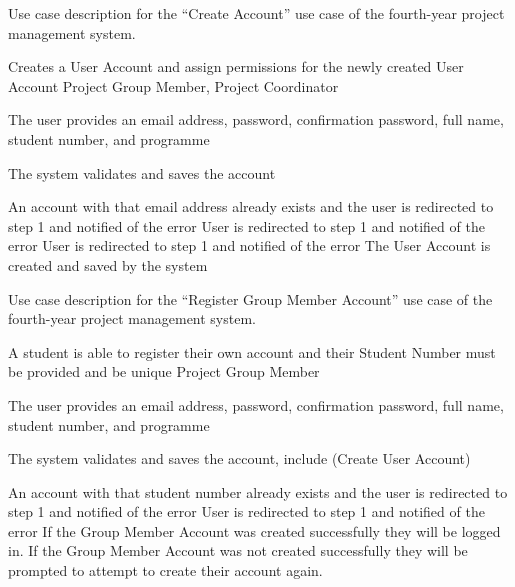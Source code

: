 \documentclass[document.tex]{subfiles}
\begin{document}
\begin{table}[!htbp]
  \centering
  \caption{Use case description for the ``Create Account'' use case of the fourth-year project management system.}
  \label{tbl:use-case-create-account}

  \begin{usecase}
    Creates a User Account and assign permissions for the newly created User Account
    Project Group Member, Project Coordinator
    \ucnormal
    \begin{ucenum}
      \item The user provides an email address, password, confirmation password, full name, student number, and programme
      \item The system validates and saves the account
    \end{ucenum}
    An account with that email address already exists and the user is redirected to step 1 and notified of the error
    User is redirected to step 1 and notified of the error
    User is redirected to step 1 and notified of the error
    The User Account is created and saved by the system
  \end{usecase}
\end{table}


\begin{table}[!htbp]
  \centering
  \caption{Use case description for the ``Register Group Member Account'' use case of the fourth-year project management system.}
  \label{tbl:use-case-register-member-account}

  \begin{usecase}
    A student is able to register their own account and their Student Number must be provided and be unique
    Project Group Member
    \ucnormal
    \begin{ucenum}
      \item The user provides an email address, password, confirmation password, full name, student number, and programme
      \item The system validates and saves the account, include (Create User Account)
    \end{ucenum}
    An account with that student number already exists and the user is redirected to step 1 and notified of the error
    User is redirected to step 1 and notified of the error
    If the Group Member Account was created successfully they will be logged in. If the Group Member Account was not created successfully they will be prompted to attempt to create their account again.
  \end{usecase}
\end{table}
\end{document}
